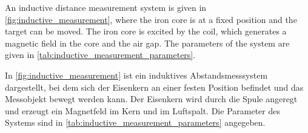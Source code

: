 An inductive distance measurement system is given in \autoref{fig:inductive_measurement}, where the iron core is at a fixed position and the target can be moved. The iron core is excited by the coil, which generates a magnetic field in the core and the air gap. The parameters of the system are given in \autoref{tab:inductive_measurement_parameters}.

\begin{germanblock}
	In \autoref{fig:inductive_measurement} ist ein induktives Abstandsmesssystem dargestellt, bei dem sich der Eisenkern an einer festen Position befindet und das Messobjekt bewegt werden kann. Der Eisenkern wird durch die Spule angeregt und erzeugt ein Magnetfeld im Kern und im Luftspalt. Die Parameter des Systems sind in \autoref{tab:inductive_measurement_parameters} angegeben.
\end{germanblock}

